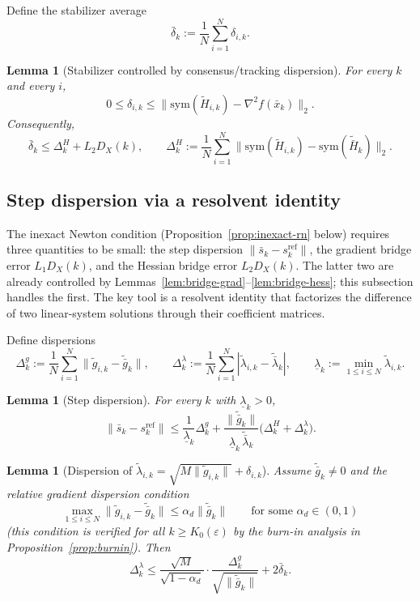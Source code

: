 \documentclass[11pt,a4paper]{article}
\newtheorem{lemma}[theorem]{Lemma}
\begin{document}
Define the stabilizer average
\[
\bar\delta_k:=\frac1N\sum_{i=1}^N \delta_{i,k}.
\]

\begin{lemma}[Stabilizer controlled by consensus/tracking dispersion]\label{lem:delta_control}
For every $k$ and every $i$,
\[
0\le \delta_{i,k}\le \big\|\mathrm{sym}(\tilde H_{i,k})-\nabla^2 f(\bar x_k)\big\|_2.
\]
Consequently,
\[
\bar\delta_k\le \Delta_k^H + L_2D_X(k),
\qquad
\Delta_k^H:=\frac1N\sum_{i=1}^N\big\|\mathrm{sym}(\tilde H_{i,k})-\mathrm{sym}(\tilde{\bar H}_k)\big\|_2 .
\]
\end{lemma}

\subsection{Step dispersion via a resolvent identity}\label{ssec:stepdisp}
The inexact Newton condition (Proposition~\ref{prop:inexact-rn} below)
requires three quantities to be small: the step dispersion
$\|\bar s_k - s_k^{\mathrm{ref}}\|$, the gradient bridge error
$L_1 D_X(k)$, and the Hessian bridge error $L_2 D_X(k)$.
The latter two are already controlled by
Lemmas~\ref{lem:bridge-grad}--\ref{lem:bridge-hess};
this subsection handles the first.
The key tool is a resolvent identity that factorizes the
difference of two linear-system solutions through their
coefficient matrices.

Define dispersions
\[
\Delta_k^g:=\frac1N\sum_{i=1}^N \|\tilde g_{i,k}-\tilde{\bar g}_k\|,
\qquad
\Delta_k^\lambda:=\frac1N\sum_{i=1}^N |\tilde\lambda_{i,k}-\tilde{\bar\lambda}_k|,
\qquad
\underline\lambda_k:=\min_{1\le i\le N}\tilde\lambda_{i,k}.
\]

\begin{lemma}[Step dispersion]\label{lem:step-disp}
For every $k$ with $\underline\lambda_k>0$,
\[
\|\bar s_k-s_k^{\mathrm{ref}}\|
\le \frac{1}{\underline\lambda_k}\Delta_k^g
+\frac{\|\tilde{\bar g}_k\|}{\underline\lambda_k\,\tilde{\bar\lambda}_k}\big(\Delta_k^H+\Delta_k^\lambda\big).
\]
\end{lemma}

\begin{lemma}[Dispersion of $\tilde\lambda_{i,k}=\sqrt{M\|\tilde g_{i,k}\|}+\delta_{i,k}$]\label{lem:lambda_dispersion}
Assume $\tilde{\bar g}_k\neq 0$ and the \emph{relative gradient dispersion} condition
\begin{equation}\label{eq:rel_grad_disp}
\max_{1\le i\le N}\|\tilde g_{i,k}-\tilde{\bar g}_k\|\le \alpha_d\|\tilde{\bar g}_k\|
\qquad\text{for some }\alpha_d\in(0,1)
\end{equation}
(this condition is verified for all $k\ge K_0(\varepsilon)$ by the
burn-in analysis in Proposition~\ref{prop:burnin}).
Then
\begin{equation}\label{eq:lambda_disp_bound}
\Delta_k^\lambda
\le
\frac{\sqrt{M}}{\sqrt{1-\alpha_d}}\cdot\frac{\Delta_k^g}{\sqrt{\|\tilde{\bar g}_k\|}}
+2\bar\delta_k.
\end{equation}
\end{lemma}
\end{document}
